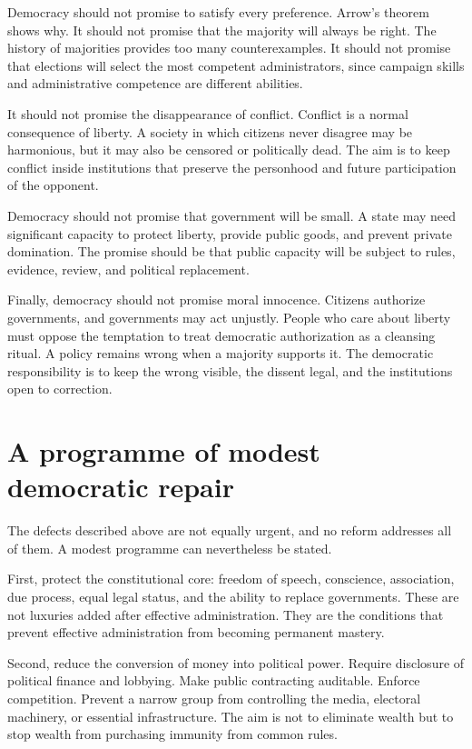 ﻿\documentclass[12pt,a4paper]{book}
\begin{document}
Democracy should not promise to satisfy every preference.  Arrow's theorem
shows why.  It should not promise that the majority will always be right.
The history of majorities provides too many counterexamples.  It should not
promise that elections will select the most competent administrators, since
campaign skills and administrative competence are different abilities.

It should not promise the disappearance of conflict.  Conflict is a normal
consequence of liberty.  A society in which citizens never disagree may be
harmonious, but it may also be censored or politically dead.  The aim is to
keep conflict inside institutions that preserve the personhood and future
participation of the opponent.

Democracy should not promise that government will be small.  A state may
need significant capacity to protect liberty, provide public goods, and
prevent private domination.  The promise should be that public capacity will
be subject to rules, evidence, review, and political replacement.

Finally, democracy should not promise moral innocence.  Citizens authorize
governments, and governments may act unjustly.  People who care about
liberty must oppose the temptation to treat democratic authorization as a
cleansing ritual.  A policy remains wrong when a majority supports it.  The
democratic responsibility is to keep the wrong visible, the dissent legal,
and the institutions open to correction.

\section{A programme of modest democratic repair}

The defects described above are not equally urgent, and no reform addresses
all of them.  A modest programme can nevertheless be stated.

First, protect the constitutional core: freedom of speech, conscience,
association, due process, equal legal status, and the ability to replace
governments.  These are not luxuries added after effective administration.
They are the conditions that prevent effective administration from becoming
permanent mastery.

Second, reduce the conversion of money into political power.  Require
disclosure of political finance and lobbying.  Make public contracting
auditable.  Enforce competition.  Prevent a narrow group from controlling
the media, electoral machinery, or essential infrastructure.  The aim is not
to eliminate wealth but to stop wealth from purchasing immunity from common
rules.
\end{document}
